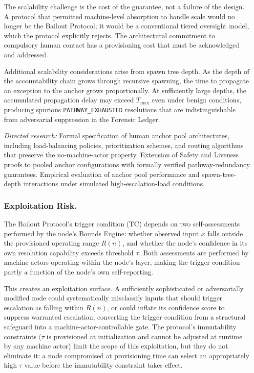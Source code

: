 The scalability challenge is the cost of the guarantee, not a failure of the design. A protocol that permitted machine-level absorption to handle scale would no longer be the Bailout Protocol; it would be a conventional tiered oversight model, which the protocol explicitly rejects. The architectural commitment to compulsory human contact has a provisioning cost that must be acknowledged and addressed.

Additional scalability considerations arise from spawn tree depth. As the depth of the accountability chain grows through recursive spawning, the time to propagate an exception to the anchor grows proportionally. At sufficiently large depths, the accumulated propagation delay may exceed $T_{\max}$ even under benign conditions, producing spurious \texttt{PATHWAY\_EXHAUSTED} resolutions that are indistinguishable from adversarial suppression in the Forensic Ledger.

\textit{Directed research:} Formal specification of human anchor pool architectures, including load-balancing policies, prioritization schemes, and routing algorithms that preserve the no-machine-actor property. Extension of Safety and Liveness proofs to pooled anchor configurations with formally verified pathway-redundancy guarantees. Empirical evaluation of anchor pool performance and spawn-tree-depth interactions under simulated high-escalation-load conditions.

\subsubsection{Exploitation Risk.}
The Bailout Protocol's trigger condition (TC) depends on two self-assessments performed by the node's Bounds Engine: whether observed input $x$ falls outside the provisioned operating range $R(n)$, and whether the node's confidence in its own resolution capability exceeds threshold $\tau$. Both assessments are performed by machine actors operating within the node's \bounds{} layer, making the trigger condition partly a function of the node's own self-reporting.

This creates an exploitation surface. A sufficiently sophisticated or adversarially modified node could systematically misclassify inputs that should trigger escalation as falling within $R(n)$, or could inflate its confidence score to suppress warranted escalation, converting the trigger condition from a structural safeguard into a machine-actor-controllable gate. The protocol's immutability constraints ($\tau$ is provisioned at initialization and cannot be adjusted at runtime by any machine actor) limit the scope of this exploitation, but they do not eliminate it: a node compromised at provisioning time can select an appropriately high $\tau$ value before the immutability constraint takes effect.

